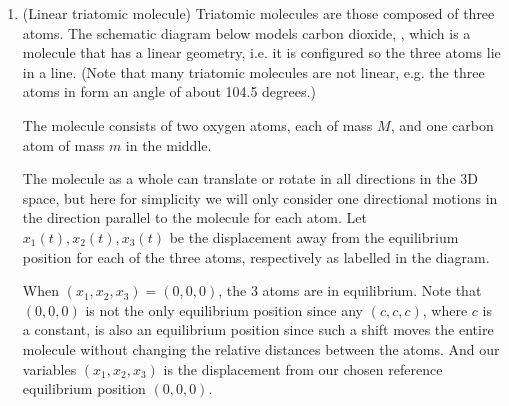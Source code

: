 \documentclass[11pt]{article}
\theoremstyle{definition}
\begin{document}
\begin{enumerate}[leftmargin=*]
\iffalse
(d) Write the above system of differential equations in the form 
\[
\left[\begin{array}{l} x_1'\\ x_2'\end{array}\right]=A  \left[\begin{array}{l} x_1\\ x_2\end{array}\right],
\]
where $A$ is a $2\times 2$ matrix.  Then find the general solution, $ \left[\begin{array}{l} x_1 \\ x_2 \end{array}\right]$, to this system by finding the eigenvalues and eigenvectors of the coefficient matrix $A$. 

(e) Use the general solution you found in  part d), now find the solution  $ \left[\begin{array}{l} x_1 \\ x_2 \end{array}\right]$ that also satisfies the above initial values. \\
\fi

\item (Linear triatomic molecule) Triatomic molecules are those composed of three atoms.  The schematic diagram below models carbon dioxide, , which is a molecule that has a linear geometry, i.e. it is configured so the three atoms lie in a line.  (Note that many triatomic molecules are not linear, e.g. the three atoms  in  form an angle of about 104.5 degrees.)

The   molecule consists of two oxygen atoms, each of mass $M$, and one carbon atom of mass $m$ in the middle.  

The molecule as a whole can translate or rotate in all directions in the 3D space, but here for simplicity we will only consider one directional motions in the direction parallel to the molecule for each atom.   Let $x_1(t), x_2(t), x_3(t)$ be the displacement away from the equilibrium position for each of the three atoms, respectively as labelled in the diagram.  

When $(x_1, x_2, x_3)=(0,0,0)$, the 3 atoms are in equilibrium.  Note that $(0,0,0)$ is not the only equilibrium position since any $(c,c,c)$, where $c$ is a constant, is also an equilibrium position since such a shift moves the entire molecule without changing the relative distances between the atoms.   And our variables $(x_1, x_2, x_3)$ is the displacement from our chosen reference equilibrium position $(0,0,0)$.


\end{enumerate}
\end{document}
